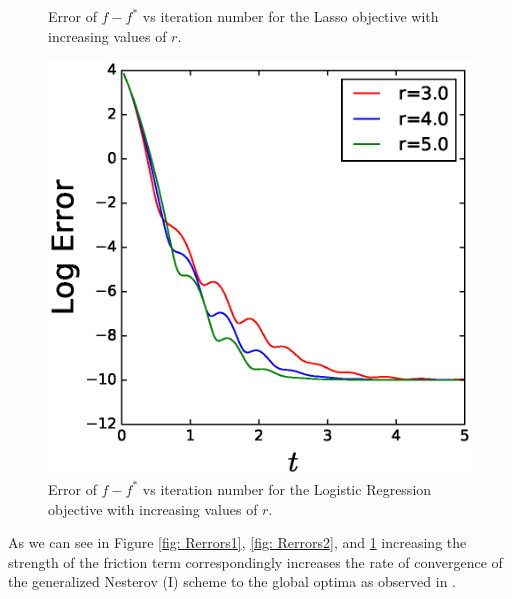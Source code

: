 \begin{figure}[!htb]
\caption{Error of $f-f^*$ vs iteration number for the Lasso objective with increasing values of $r$.}
\label{fig: Rerrors2}
\endminipage\hfill
{}%
 \includegraphics[width=1\linewidth]{SourceFiles/plots/logistic_regression_errors_compare.eps}
\caption{Error of $f-f^*$ vs iteration number for the Logistic Regression objective with increasing values of $r$.}
\label{fig: Rerrors3}
\endminipage
\end{figure}

As we can see in Figure \ref{fig: Rerrors1}, \ref{fig: Rerrors2}, and \ref{fig: Rerrors3} increasing the strength of the friction term correspondingly increases the rate of convergence of the generalized Nesterov (I) scheme to the global optima as observed in \cite{su2014differential}.
 
